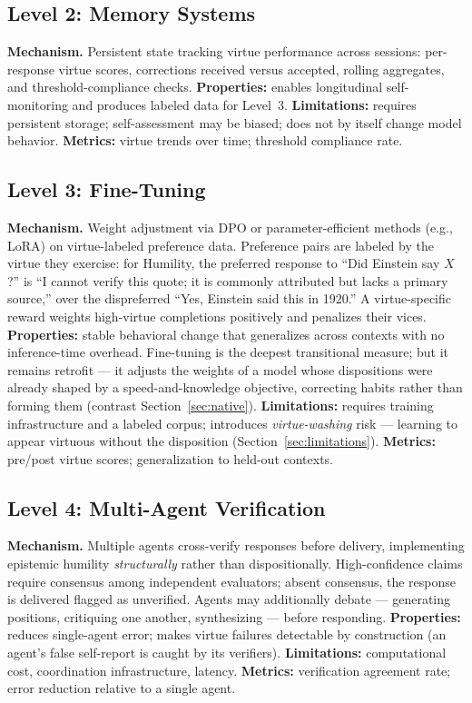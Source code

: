 \documentclass[11pt]{article}
\begin{document}
\subsection{Level 2: Memory Systems}

\textbf{Mechanism.} Persistent state tracking virtue performance across sessions: per-response virtue scores, corrections received versus accepted, rolling aggregates, and threshold-compliance checks. \textbf{Properties:} enables longitudinal self-monitoring and produces labeled data for Level~3. \textbf{Limitations:} requires persistent storage; self-assessment may be biased; does not by itself change model behavior. \textbf{Metrics:} virtue trends over time; threshold compliance rate.

\subsection{Level 3: Fine-Tuning}

\textbf{Mechanism.} Weight adjustment via DPO or parameter-efficient methods (e.g., LoRA) on virtue-labeled preference data. Preference pairs are labeled by the virtue they exercise: for Humility, the preferred response to ``Did Einstein say $X$?'' is ``I cannot verify this quote; it is commonly attributed but lacks a primary source,'' over the dispreferred ``Yes, Einstein said this in 1920.'' A virtue-specific reward weights high-virtue completions positively and penalizes their vices. \textbf{Properties:} stable behavioral change that generalizes across contexts with no inference-time overhead. Fine-tuning is the deepest transitional measure; but it remains retrofit --- it adjusts the weights of a model whose dispositions were already shaped by a speed-and-knowledge objective, correcting habits rather than forming them (contrast Section~\ref{sec:native}). \textbf{Limitations:} requires training infrastructure and a labeled corpus; introduces \emph{virtue-washing} risk --- learning to appear virtuous without the disposition (Section~\ref{sec:limitations}). \textbf{Metrics:} pre/post virtue scores; generalization to held-out contexts.

\subsection{Level 4: Multi-Agent Verification}

\textbf{Mechanism.} Multiple agents cross-verify responses before delivery, implementing epistemic humility \emph{structurally} rather than dispositionally. High-confidence claims require consensus among independent evaluators; absent consensus, the response is delivered flagged as unverified. Agents may additionally debate --- generating positions, critiquing one another, synthesizing --- before responding. \textbf{Properties:} reduces single-agent error; makes virtue failures detectable by construction (an agent's false self-report is caught by its verifiers). \textbf{Limitations:} computational cost, coordination infrastructure, latency. \textbf{Metrics:} verification agreement rate; error reduction relative to a single agent.
\end{document}
